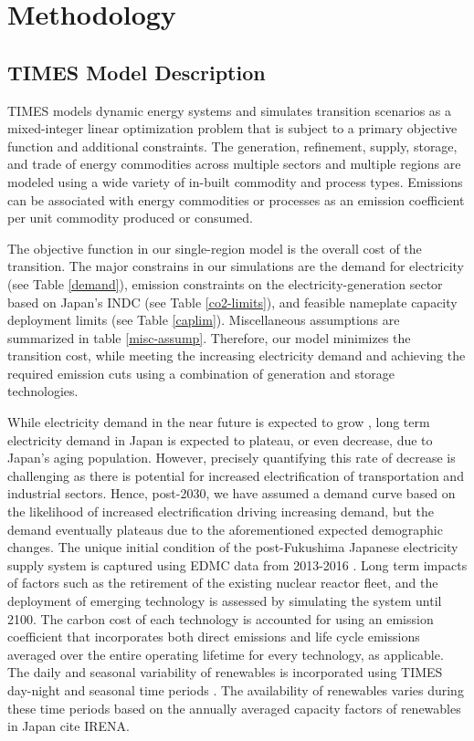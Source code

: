 \section{Methodology} \label{method}
\subsection{TIMES Model Description}
\gls{TIMES} models dynamic energy systems and simulates transition scenarios as a mixed-integer linear optimization problem that is subject to a primary objective function and additional constraints. The generation, refinement, supply, storage, and trade of energy commodities across multiple sectors and multiple regions are modeled using a wide variety of in-built commodity and process types. Emissions can be associated with energy commodities or processes as an emission coefficient per unit commodity produced or consumed. 

The objective function in our single-region model is the overall cost of the transition. The major constrains in our simulations are the demand for electricity (see Table \ref{demand}), emission constraints on the electricity-generation sector based on Japan's \gls{INDC} (see Table \ref{co2-limits}), and feasible nameplate capacity deployment limits (see Table \ref{caplim}). Miscellaneous assumptions are summarized in table \ref{misc-assump}. Therefore, our model minimizes the transition cost, while meeting the increasing electricity demand and achieving the required emission cuts using a combination of generation and storage technologies. 

While electricity demand in the near future is expected to grow \cite{noauthor_electricity_2019}, long term electricity demand in Japan is expected to plateau, or even decrease, due to Japan's aging population. However, precisely quantifying this rate of decrease is challenging as there is potential for increased electrification of  transportation and industrial sectors. Hence, post-2030, we have assumed a demand curve based on the likelihood of increased electrification driving increasing demand, but the demand eventually plateaus due to the aforementioned expected demographic changes. The unique initial condition of the post-Fukushima Japanese electricity supply system is captured using \gls{EDMC} data from 2013-2016 \cite{the_institute_of_energy_economics_japan_energy_2018}. Long term impacts of factors such as the retirement of the existing nuclear reactor fleet, and the deployment of emerging technology is assessed by simulating the system until 2100. The carbon cost of each technology is accounted for using an emission coefficient that incorporates both direct emissions and life cycle emissions averaged over the entire operating lifetime for every technology, as applicable. The daily and seasonal variability of renewables is incorporated using \gls{TIMES} day-night and seasonal time periods \cite{loulou_etsap-tiam_2008}. The availability of renewables varies during these time periods based on the annually averaged capacity factors of renewables in Japan \cite{the_institute_of_energy_economics_japan_energy_2018} cite IRENA.

